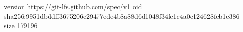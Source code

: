 version https://git-lfs.github.com/spec/v1
oid sha256:9951dbddff3675206c29477ede4b8a88d6d1048f34fc1c4a0c124628feb1e386
size 179196

